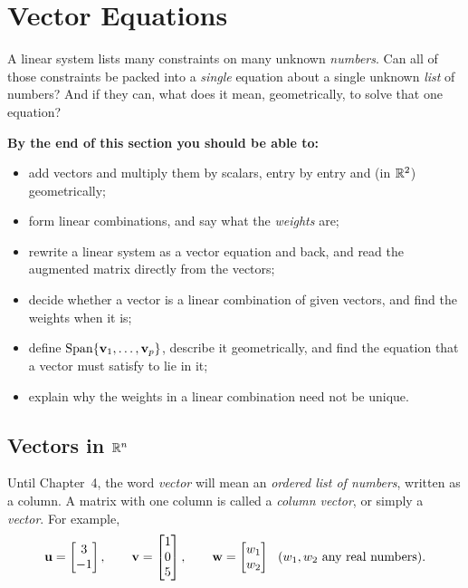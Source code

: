 \documentclass[11pt]{article}
\begin{document}
\section{Vector Equations}

\begin{guide}
A linear system lists many constraints on many unknown \emph{numbers}. Can all of those constraints be
packed into a \emph{single} equation about a single unknown \emph{list} of numbers? And if they can, what
does it mean, geometrically, to solve that one equation?
\end{guide}

\textbf{By the end of this section you should be able to:}
\begin{itemize}
  \item add vectors and multiply them by scalars, entry by entry and (in $\mathbb{R}^2$) geometrically;
  \item form linear combinations, and say what the \emph{weights} are;
  \item rewrite a linear system as a vector equation and back, and read the augmented matrix directly from the vectors;
  \item decide whether a vector is a linear combination of given vectors, and find the weights when it is;
  \item define $\operatorname{Span}\{\mathbf{v}_1,\dots,\mathbf{v}_p\}$, describe it geometrically, and find the equation that
        a vector must satisfy to lie in it;
  \item explain why the weights in a linear combination need not be unique.
\end{itemize}

\subsection*{Vectors in $\mathbb{R}^n$}

Until Chapter~4, the word \emph{vector} will mean an \emph{ordered list of numbers}, written as a column. A matrix
with one column is called a \emph{column vector}, or simply a \emph{vector}. For example,
\[
\mathbf{u}=\begin{bmatrix}3\\-1\end{bmatrix},\qquad
\mathbf{v}=\begin{bmatrix}1\\0\\5\end{bmatrix},\qquad
\mathbf{w}=\begin{bmatrix}w_1\\w_2\end{bmatrix}\ \ (w_1,w_2 \text{ any real numbers}).
\]
\end{document}
